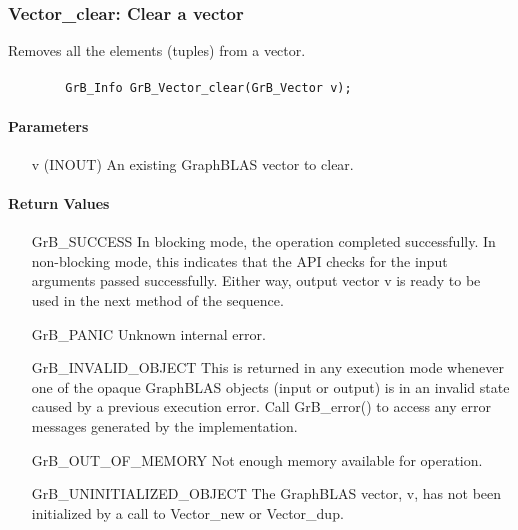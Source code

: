 \subsubsection{{\sf Vector\_clear}: Clear a vector}

Removes all the elements (tuples) from a vector.

\paragraph{\syntax}

\begin{verbatim}
        GrB_Info GrB_Vector_clear(GrB_Vector v);
\end{verbatim}

\paragraph{Parameters}

\begin{itemize}[leftmargin=1.1in]
    \item[{\sf v}] ({\sf INOUT}) An existing GraphBLAS vector to clear.
\end{itemize}

\paragraph{Return Values}

\begin{itemize}[leftmargin=2.1in]
    \item[{\sf GrB\_SUCCESS}]         In blocking mode, the operation completed
    successfully. In non-blocking mode, this indicates that the API checks 
    for the input arguments passed successfully. Either way, output vector 
    {\sf v} is ready to be used in the next method of the sequence.

    \item[{\sf GrB\_PANIC}]           Unknown internal error.
    
    \item[{\sf GrB\_INVALID\_OBJECT}] This is returned in any execution mode 
    whenever one of the opaque GraphBLAS objects (input or output) is in an invalid 
    state caused by a previous execution error.  Call {\sf GrB\_error()} to access 
    any error messages generated by the implementation.

    \item[{\sf GrB\_OUT\_OF\_MEMORY}] Not enough memory available for operation.
    
    \item[{\sf GrB\_UNINITIALIZED\_OBJECT}]  The GraphBLAS vector, {\sf v}, has 
    not been initialized by a call to {\sf Vector\_new} or {\sf Vector\_dup}.
    
\end{itemize}

